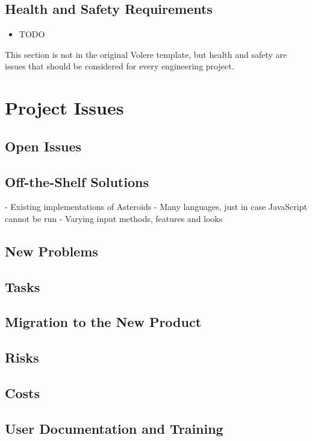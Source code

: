 \documentclass[12pt, titlepage]{article}
\begin{document}
\subsection{Health and Safety Requirements}
  \begin{itemize}
    \item TODO
  \end{itemize}

This section is not in the original Volere template, but health and safety are
issues that should be considered for every engineering project.

\section{Project Issues}

\subsection{Open Issues}

\subsection{Off-the-Shelf Solutions}
- Existing implementations of Asteroids
  - Many languages, just in case JavaScript cannot be run
  - Varying input methods, features and looks

\subsection{New Problems}

\subsection{Tasks}

\subsection{Migration to the New Product}

\subsection{Risks}

\subsection{Costs}

\subsection{User Documentation and Training}
\end{document}
